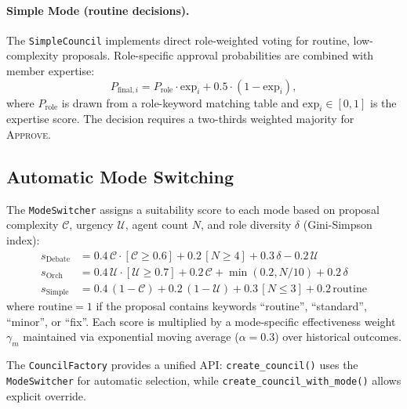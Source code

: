 \documentclass[11pt]{article}
\begin{document}
\paragraph{Simple Mode (routine decisions).}
The \texttt{SimpleCouncil} implements direct role-weighted voting for routine,
low-complexity proposals. Role-specific approval probabilities are combined with
member expertise:
\begin{equation}
  P_{\text{final},i} = P_{\text{role}} \cdot \text{exp}_i
                       + 0.5 \cdot (1 - \text{exp}_i),
  \label{eq:simple_vote}
\end{equation}
where $P_{\text{role}}$ is drawn from a role-keyword matching table and
$\text{exp}_i \in [0,1]$ is the expertise score. The decision requires a
two-thirds weighted majority for \textsc{Approve}.

\subsection{Automatic Mode Switching}

The \texttt{ModeSwitcher} assigns a suitability score to each mode based on
proposal complexity $\mathcal{C}$, urgency $\mathcal{U}$, agent count $N$, and
role diversity $\delta$ (Gini-Simpson index):
\begin{align}
  s_{\text{Debate}} &= 0.4\,\mathcal{C}\cdot[\mathcal{C} \geq 0.6]
                      + 0.2\,[N \geq 4]
                      + 0.3\,\delta
                      - 0.2\,\mathcal{U} \\
  s_{\text{Orch}}   &= 0.4\,\mathcal{U}\cdot[\mathcal{U} \geq 0.7]
                      + 0.2\,\mathcal{C}
                      + \min(0.2, N/10)
                      + 0.2\,\delta \\
  s_{\text{Simple}} &= 0.4\,(1-\mathcal{C})
                      + 0.2\,(1-\mathcal{U})
                      + 0.3\,[N \leq 3]
                      + 0.2\,\text{routine}
\end{align}
where $\text{routine} = 1$ if the proposal contains keywords
``routine'', ``standard'', ``minor'', or ``fix''. Each score is multiplied by
a mode-specific effectiveness weight $\gamma_m$ maintained via exponential
moving average ($\alpha = 0.3$) over historical outcomes.

The \texttt{CouncilFactory} provides a unified API: \texttt{create\_council()}
uses the \texttt{ModeSwitcher} for automatic selection, while
\texttt{create\_council\_with\_mode()} allows explicit override.
\end{document}
